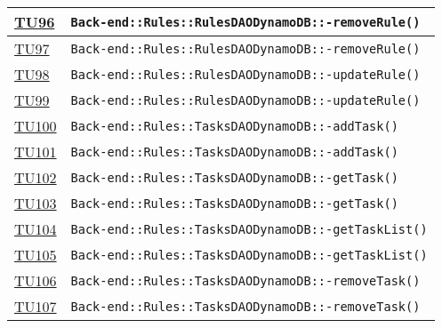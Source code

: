 \begin{longtable}{|>{\centering}m{1cm}|m{12cm}<{\centering}|}
\hyperlink{TU96}{TU96} & \texttt{Back-end::Rules::RulesDAODynamoDB::-\linebreak removeRule()}\\ \hline

\hyperlink{TU97}{TU97} & \texttt{Back-end::Rules::RulesDAODynamoDB::-\linebreak removeRule()}\\ \hline

\hyperlink{TU98}{TU98} & \texttt{Back-end::Rules::RulesDAODynamoDB::-\linebreak updateRule()}\\ \hline

\hyperlink{TU99}{TU99} & \texttt{Back-end::Rules::RulesDAODynamoDB::-\linebreak updateRule()}\\ \hline

\hyperlink{TU100}{TU100} & \texttt{Back-end::Rules::TasksDAODynamoDB::-\linebreak addTask()}\\ \hline

\hyperlink{TU101}{TU101} & \texttt{Back-end::Rules::TasksDAODynamoDB::-\linebreak addTask()}\\ \hline

\hyperlink{TU102}{TU102} & \texttt{Back-end::Rules::TasksDAODynamoDB::-\linebreak getTask()}\\ \hline

\hyperlink{TU103}{TU103} & \texttt{Back-end::Rules::TasksDAODynamoDB::-\linebreak getTask()}\\ \hline

\hyperlink{TU104}{TU104} & \texttt{Back-end::Rules::TasksDAODynamoDB::-\linebreak getTaskList()}\\ \hline

\hyperlink{TU105}{TU105} & \texttt{Back-end::Rules::TasksDAODynamoDB::-\linebreak getTaskList()}\\ \hline

\hyperlink{TU106}{TU106} & \texttt{Back-end::Rules::TasksDAODynamoDB::-\linebreak removeTask()}\\ \hline

\hyperlink{TU107}{TU107} & \texttt{Back-end::Rules::TasksDAODynamoDB::-\linebreak removeTask()}\\ \hline


\end{longtable}
